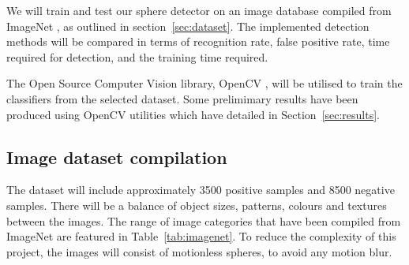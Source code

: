 \documentclass[11pt]{scrartcl}
\begin{document}
{        We will train and test our sphere detector on an image
        database compiled from ImageNet \citep{imagenet_cvpr09}, as outlined in
        section~\ref{sec:dataset}. The implemented detection methods will be
        compared in terms of recognition rate, false positive rate, time
        required for detection, and the training time required.

        The Open Source Computer Vision library, OpenCV \citep{opencv_library},
        will be utilised to train the classifiers from the selected dataset.
        Some prelimimary results have been produced using OpenCV utilities
        which have detailed in Section~\ref{sec:results}.

        \subsection{Image dataset compilation} {
        \label{sec:dataset}

            The dataset will include approximately 3500 positive samples and 8500
            negative samples. There will be a balance of object sizes, patterns,
            colours and textures between the images. The range of image categories
            that have been compiled from ImageNet are featured in Table~\ref{tab:imagenet}.
            To reduce the complexity of this project, the images will consist of
            motionless spheres, to avoid any motion blur.

}}
\end{document}
